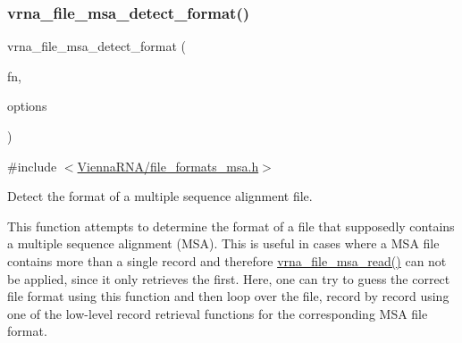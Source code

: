 \mbox{\label{group__file__utils_ga627ac281b5f11c63861726e6472626c9}} 
\subsubsection{\texorpdfstring{vrna\+\_\+file\+\_\+msa\+\_\+detect\+\_\+format()}{vrna\_file\_msa\_detect\_format()}}
{\footnotesize\ttfamily vrna\+\_\+file\+\_\+msa\+\_\+detect\+\_\+format (\begin{DoxyParamCaption}\item[{const char $\ast$}]{fn,  }\item[{unsigned int}]{options }\end{DoxyParamCaption})}



{\ttfamily \#include $<$\mbox{\hyperlink{file__formats__msa_8h}{Vienna\+R\+N\+A/file\+\_\+formats\+\_\+msa.\+h}}$>$}



Detect the format of a multiple sequence alignment file. 

This function attempts to determine the format of a file that supposedly contains a multiple sequence alignment (M\+SA). This is useful in cases where a M\+SA file contains more than a single record and therefore \mbox{\hyperlink{group__file__utils_ga08a01c40ac5f5e0e04e9ae2258c99aa6}{vrna\+\_\+file\+\_\+msa\+\_\+read()}} can not be applied, since it only retrieves the first. Here, one can try to guess the correct file format using this function and then loop over the file, record by record using one of the low-\/level record retrieval functions for the corresponding M\+SA file format.

